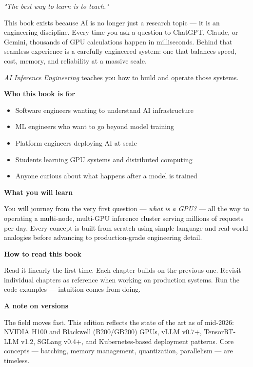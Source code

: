 \documentclass[10pt, oneside, openany]{book}
\begin{document}
\noindent\textit{"The best way to learn is to teach."}

\vspace{0.5em}

This book exists because AI is no longer just a research topic --- it is an
engineering discipline.  Every time you ask a question to ChatGPT, Claude, or
Gemini, thousands of GPU calculations happen in milliseconds.  Behind that seamless
experience is a carefully engineered system: one that balances speed, cost, memory,
and reliability at a massive scale.

\emph{AI Inference Engineering} teaches you how to build and operate those systems.

\bigskip
\noindent\textbf{Who this book is for}

\begin{itemize}
  \item Software engineers wanting to understand AI infrastructure
  \item ML engineers who want to go beyond model training
  \item Platform engineers deploying AI at scale
  \item Students learning GPU systems and distributed computing
  \item Anyone curious about what happens after a model is trained
\end{itemize}

\bigskip
\noindent\textbf{What you will learn}

You will journey from the very first question --- \textit{what is a GPU?} --- all the
way to operating a multi-node, multi-GPU inference cluster serving millions of
requests per day.  Every concept is built from scratch using simple language and
real-world analogies before advancing to production-grade engineering detail.

\bigskip
\noindent\textbf{How to read this book}

Read it linearly the first time.  Each chapter builds on the previous one.
Revisit individual chapters as reference when working on production systems.
Run the code examples --- intuition comes from doing.

\bigskip
\noindent\textbf{A note on versions}

The field moves fast.  This edition reflects the state of the art as of mid-2026:
NVIDIA H100 and Blackwell (B200/GB200) GPUs, vLLM v0.7+, TensorRT-LLM v1.2,
SGLang v0.4+, and Kubernetes-based deployment patterns.  Core concepts --- batching,
memory management, quantization, parallelism --- are timeless.
\end{document}

